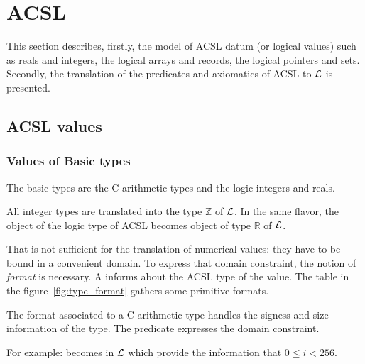 
\section{ACSL} \label{sec-acsl}

This section describes, firstly, the model of \textsf{ACSL} datum (or
logical values) such as reals and integers, the logical arrays and
records, the logical pointers and sets. Secondly, the translation
of the predicates and axiomatics of \textsf{ACSL} to $\cal{L}$ is 
presented.


\subsection{ACSL values}

\subsubsection{Values of Basic types}

 The basic types are the C arithmetic types and the logic integers and reals. 
 
 All integer types are translated into the type $\mathbb{Z}$ of $\cal{L}$.
In the same flavor, the object of the logic type  of 
 \textsf{ACSL} becomes object of type $\mathbb{R}$ of $\cal{L}$.

 That is not sufficient for the translation of numerical values:
 they have to be bound in a convenient domain. 
 To express that domain constraint, the notion of {\it format} is necessary.  
 A  informs about the \textsf{ACSL} type of the
 value. The table in the figure~\ref{fig:type_format} gathers some
 primitive formats.

 The format associated to a C arithmetic type handles the signess and
 size information of the type. The predicate
  expresses the domain constraint.

 For example:  becomes in $\cal{L}$ 
  which provide the
 information that $0 \le i < 256$.


